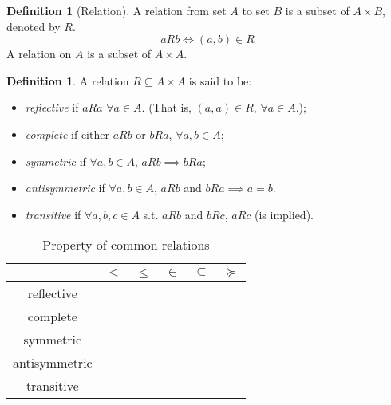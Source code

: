 \documentclass[12pt]{article}
\theoremstyle{definition}
\newtheorem{definition}[theorem]{Definition}
\theoremstyle{plain}
\newcommand{\cmark}{\ding{51}}%
\newcommand{\xmark}{\ding{55}}%
\begin{document}
\begin{definition}
    [Relation]
    A relation from set $A$ to set $B$ is a subset of $A\times B$, denoted by
    $R$.
    \[
        a R b \iff (a,b) \in R
    \]
    A relation on $A$ is a subset of $A \times A$.

    \label{def:a_relation_on_A}
\end{definition}

\begin{definition}
    A relation $R \subseteq A \times A$ is said to be:
    \begin{itemize}
        \item \emph{reflective} if $a R a$ $\forall a \in A$. (That is, $(a,a) \in R
            $, $\forall a \in A$.);

        \item \emph{complete} if either $aRb$ or $b R a$, $\forall a, b \in A$;

        \item \emph{symmetric} if $\forall a, b \in A$, $aR b \implies b R a$;

        \item \emph{antisymmetric} if $\forall a, b \in A$, $a R b $ and $ b R a
            \implies a = b$.

        \item \emph{transitive} if $\forall a,b,c \in A$ s.t. $aRb$ and $bRc$,
            $aRc$ (is implied).
    \end{itemize}
\end{definition}

\begin{table}[htp!]
    \caption{Property of common relations}
    \bigskip
    \centering
    \begin{tabular}{c|c|c|c|c|c}
                        & $<$    & $\le$  & $\in$  & $\subseteq $ & $\succeq$ \\
          \hline
          reflective    & \xmark & \cmark & \xmark & \cmark       & \cmark    \\
          complete      & \xmark & \cmark & \xmark & \xmark       & \cmark    \\
          symmetric     & \xmark & \xmark & \xmark & \xmark       & \xmark    \\
          antisymmetric & \cmark & \cmark & \cmark & \cmark       & \xmark    \\
          transitive    & \cmark & \cmark & \xmark & \cmark       & \cmark
    \end{tabular}
\end{table}
\end{document}
